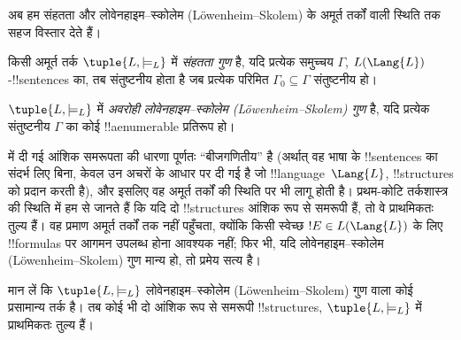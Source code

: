 \documentclass[../../../include/open-logic-section]{subfiles}
\begin{document}


अब हम संहतता और लोवेनहाइम--स्कोलेम (L\"owenheim--Skolem) के अमूर्त तर्कों वाली स्थिति तक सहज
विस्तार देते हैं।

\begin{defn}
किसी अमूर्त तर्क $\tuple{L, \models_L}$ में \emph{संहतता गुण} है, यदि
प्रत्येक समुच्चय $\Gamma$, $L(\Lang{L})$-!!{sentence}s का, तब संतुष्टनीय
होता है जब प्रत्येक परिमित $\Gamma_0 \subseteq \Gamma$ संतुष्टनीय हो।
\end{defn}

\begin{defn}
$\tuple{L, \models_L}$ में \emph{अवरोही लोवेनहाइम--स्कोलेम (L\"owenheim--Skolem) गुण} है, यदि
प्रत्येक संतुष्टनीय $\Gamma$ का कोई !!a{enumerable} प्रतिरूप हो।
\end{defn}


 में दी गई आंशिक समरूपता की धारणा पूर्णतः
``बीजगणितीय'' है (अर्थात् वह भाषा के !!{sentence}s का संदर्भ लिए बिना,
केवल उन अचरों के आधार पर दी गई है जो !!{language}~$\Lang{L}$,
!!{structure}s को प्रदान करती है), और इसलिए वह अमूर्त तर्कों की स्थिति पर भी लागू होती है।
प्रथम-कोटि तर्कशास्त्र की स्थिति में हम  से
जानते हैं कि यदि दो !!{structure}s आंशिक रूप से समरूपी हैं, तो वे
प्राथमिकतः तुल्य हैं। वह प्रमाण अमूर्त तर्कों तक नहीं पहुँचता, क्योंकि किसी
स्वेच्छ $!E \in L(\Lang{L})$ के लिए !!{formula}s पर आगमन उपलब्ध होना
आवश्यक नहीं; फिर भी, यदि लोवेनहाइम--स्कोलेम (L\"owenheim--Skolem) गुण मान्य हो, तो प्रमेय सत्य है।

\begin{thm}
मान लें कि $\tuple{L, \models_L}$ लोवेनहाइम--स्कोलेम (L\"owenheim--Skolem) गुण वाला कोई
प्रसामान्य तर्क है। तब कोई भी दो आंशिक रूप से समरूपी !!{structure}s,
$\tuple{L,
  \models_L}$ में प्राथमिकतः तुल्य हैं।
\end{thm}
\end{document}
